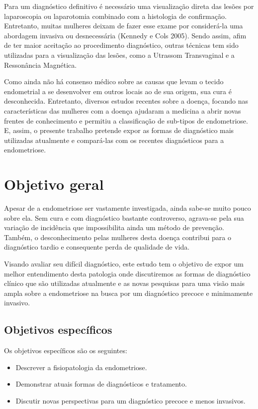 \documentclass[12pt]{article} %
\begin{document}
Para um diagnóstico definitivo é necessário uma visualização direta
das lesões por laparoscopia ou laparotomia combinado com a histologia
de confirmação. Entretanto, muitas mulheres deixam de fazer esse exame
por considerá-la uma abordagem invasiva ou desnecessária (Kennedy e
Cols 2005).  Sendo assim, afim de ter maior aceitação ao procedimento
diagnóstico, outras técnicas tem sido utilizadas para a visualização
das lesões, como a Utrassom Transvaginal e a Ressonância Magnética.

Como ainda não há consenso médico sobre as causas que levam o tecido
endometrial a se desenvolver em outros locais ao de sua origem, sua
cura é desconhecida. Entretanto, diversos estudos recentes sobre a
doença, focando nas características das mulheres com a doença ajudaram
a medicina a abrir novas frentes de conhecimento e permitiu a
classificação de sub-tipos de endometriose. E, assim, o presente
trabalho pretende expor as formas de diagnóstico mais utilizadas
atualmente e compará-las com os recentes diagnósticos para a
endometriose.

\section{Objetivo geral}

Apesar de a endometriose ser vastamente investigada, ainda sabe-se
muito pouco sobre ela. Sem cura e com diagnóstico bastante controverso,
agrava-se pela sua variação de incidência que impossibilita ainda um
método de prevenção. Também, o desconhecimento pelas mulheres desta
doença contribui para o diagnóstico tardio e consequente perda de
qualidade de vida.

Visando avaliar seu difícil diagnóstico, este estudo tem o objetivo de
expor um melhor entendimento desta patologia onde discutiremos as
formas de diagnóstico clínico que são utilizadas atualmente e as novas
pesquisas para uma visão mais ampla sobre a endometriose na busca por
um diagnóstico precoce e minimamente invasivo.

\subsection{Objetivos específicos}

Os objetivos específicos são os seguintes:

\begin{itemize}
\item Descrever a fisiopatologia da endometriose.
\item Demonstrar atuais formas de diagnósticos e tratamento.
\item Discutir novas perspectivas para um diagnóstico precoce e menos
invasivos.
\end{itemize}
\newpage
\end{document}
